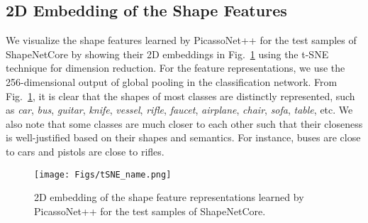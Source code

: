 \subsection{2D Embedding of the Shape Features}
We visualize the shape features learned by PicassoNet++ for the test samples of ShapeNetCore \cite{chang2015shapenet} by showing their 2D embeddings in Fig.~\ref{fig:tSNE_2Dembed_ShapeNetCore} using the t-SNE technique \cite{van2008visualizing} for dimension reduction. For the feature representations, we use the 256-dimensional output of global pooling in the classification network. 
From Fig.~\ref{fig:tSNE_2Dembed_ShapeNetCore}, it is clear that the shapes of most classes are distinctly represented, such as \textit{car}, \textit{bus},  \textit{guitar}, \textit{knife}, \textit{vessel}, \textit{rifle}, \textit{faucet},  \textit{airplane}, \textit{chair}, \textit{sofa}, \textit{table}, etc. We also note that some classes are much closer to each other such that their  closeness is well-justified based on their shapes and semantics. For instance, buses are close to cars and pistols are close to rifles.

\begin{figure}[!t]
    \centering
\hspace{-1mm}\texttt{[image: Figs/tSNE\_name.png]} \\
    \vspace{-2mm}
    \caption{\color{black}2D embedding of the shape feature representations learned by PicassoNet++ for the test  samples of ShapeNetCore.}
    \label{fig:tSNE_2Dembed_ShapeNetCore}
\end{figure}

